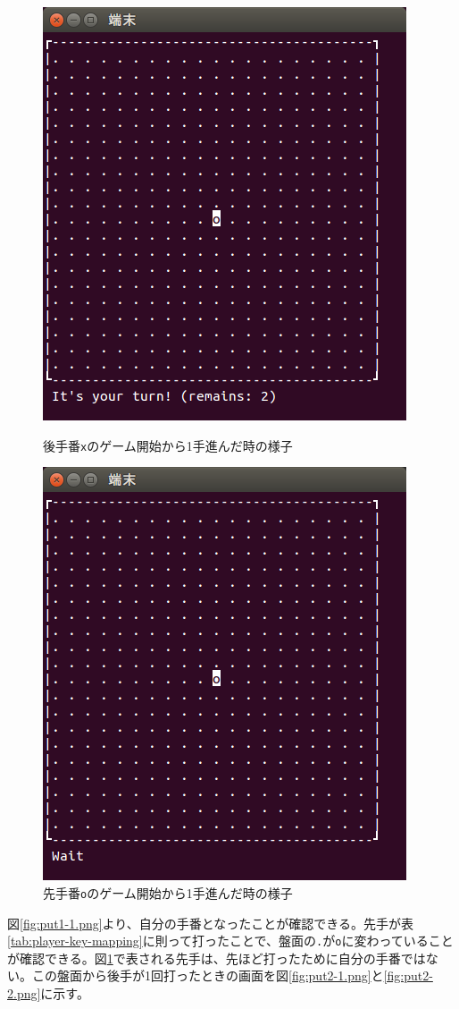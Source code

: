 \documentclass[a4j, titlepage, 10pt]{jsarticle}
\newcommand{\code}[1]{\texttt{#1}}
\begin{document}
\begin{figure}[H]
  \begin{minipage}{0.5\hsize}
    \centering
    \includegraphics[scale=0.5]{img/put1-1.png}
    \caption{後手番\code{x}のゲーム開始から1手進んだ時の様子}
    \label{fig:put1-1.png}
  \end{minipage}
  \begin{minipage}{0.5\hsize}
    \includegraphics[scale=0.5]{img/put1-2.png}
    \caption{先手番\code{o}のゲーム開始から1手進んだ時の様子}
    \label{fig:put1-2.png}
  \end{minipage}
\end{figure}
図\ref{fig:put1-1.png}より、自分の手番となったことが確認できる。先手が表\ref{tab:player-key-mapping}に則って打ったことで、盤面の\texttt{.}が\texttt{o}に変わっていることが確認できる。図\ref{fig:put1-2.png}で表される先手は、先ほど打ったために自分の手番ではない。この盤面から後手が1回打ったときの画面を図\ref{fig:put2-1.png}と\ref{fig:put2-2.png}に示す。
\end{document}
